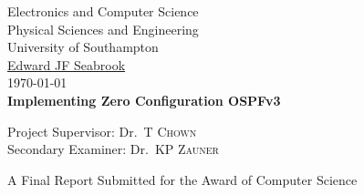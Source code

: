 
\begin{titlepage}

\begin{center}



\LARGE Electronics and Computer Science\\
Physical Sciences and Engineering\\
University of Southampton
\\[1.5cm]

\href{mailto:ejfs1g10@ecs.soton.ac.uk}{Edward JF Seabrook}\\[0.5cm]

\today \\[1cm]
{\bfseries Implementing Zero Configuration OSPFv3}\\[1.5cm]

\vfill

\large
Project Supervisor: 
Dr.~T \textsc{Chown}\\

\large
Secondary Examiner:
Dr.~KP \textsc{Zauner} 

\vfill

A Final Report Submitted for the Award of Computer Science

\end{center}

\end{titlepage}
